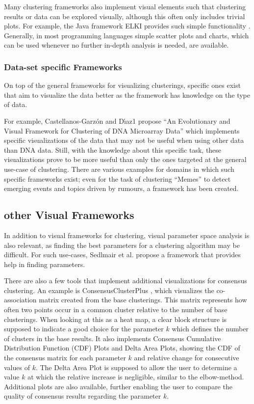 \documentclass[
	a4paper,
	english,
	twoside,
	openright,               
	11pt                            
	]{report}
\begin{document}
Many clustering frameworks also implement visual elements such that clustering results or data can be explored visually, although this often only includes trivial plots. For example, the Java framework ELKI provides such simple functionality \cite{10.14778/2824032.2824115}. Generally, in most programming languages simple scatter plots and charts, which can be used whenever no further in-depth analysis is needed, are available.

\subsubsection{Data-set specific Frameworks}
On top of the general frameworks for visualizing clusterings, specific ones exist that aim to visualize the data better as the framework has knowledge on the type of data. 

For example, Castellanos-Garz\'{o}n and D\'{ı}az1 \cite{DNAVis} propose ``An Evolutionary and Visual Framework for Clustering of DNA Microarray Data'' which implements specific visualizations of the data that may not be useful when using other data than DNA data. Still, with the knowledge about this specific task, these visualizations prove to be more useful than only the ones targeted at the general use-case of clustering. There are various examples for domains in which such specific frameworks exist; even for the task of clustering ``Memes'' \cite{Dang2017} to detect emerging events and topics driven by rumours, a framework has been created.

\subsection{other Visual Frameworks}

In addition to visual frameworks for clustering, visual parameter space analysis is also relevant, as finding the best parameters for a clustering algorithm may be difficult. For such use-cases, Sedlmair et al. \cite{6876043} propose a framework that provides help in finding parameters.

There are also a few tools that implement additional visualizations for consensus clustering. An example is ConsensusClusterPlus \cite{10.1093/bioinformatics/btq170}, which visualizes the co-association matrix created from the base clusterings. This matrix represents how often two points occur in a common cluster relative to the number of base clusterings. When looking at this as a heat map, a clear block structure is supposed to indicate a good choice for the parameter $k$ which defines the number of clusters in the base results. It also implements Consensus Cumulative Distribution Function (CDF) Plots and Delta Area Plots, showing the CDF of the consensus matrix for each parameter $k$ and relative change for consecutive values of $k$. The Delta Area Plot is supposed to allow the user to determine a value $k$ at which the relative increase is negligible, similar to the elbow-method. Additional plots are also available, further enabling the user to compare the quality of consensus results regarding the parameter $k$.
\end{document}
